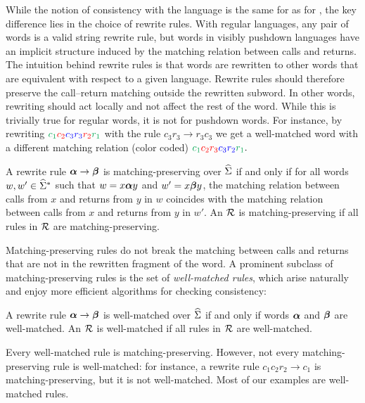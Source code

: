 While the notion of consistency with the language is the same for \DVPA as for \DFA, the key difference lies in the choice of rewrite rules. 
With regular languages, any pair of words is a valid string rewrite rule, but words in visibly pushdown languages 
have an implicit structure induced by the matching relation between calls and returns.
The intuition behind rewrite rules is that words are rewritten to other words that are equivalent with respect to a given language. 
Rewrite rules should therefore preserve the call--return matching outside the rewritten subword. 
In other words, rewriting should act locally and not affect the rest of the word.
While this is trivially true for regular words, it is not for pushdown words. 
For instance, by rewriting 
\(
\textcolor{Green}{c_1} \textcolor{red}{c_2} \textcolor{blue}{c_3} \textcolor{blue}{r_3} \textcolor{red}{r_2} \textcolor{Green}{r_1}
\) with the rule $c_3 r_3 \to r_3 c_3$
we get a well-matched word with a different matching relation (color coded) 
\(
\textcolor{Green}{c_1} \textcolor{red}{c_2} \textcolor{red}{r_3} \textcolor{blue}{c_3} \textcolor{blue}{r_2}  \textcolor{Green}{r_1}.
\)


\begin{definition}
A rewrite rule $\boldsymbol{\alpha} \to \boldsymbol{\beta}$ is {matching-preserving} over $\widehat{\Sigma}$ if and only if for all words $w,w' \in \widehat{\Sigma}^*$
such that $w = x \boldsymbol{\alpha} y$ and $w' = x \boldsymbol{\beta} y$, the matching relation between calls from $x$ and returns from $y$ in $w$
coincides with the matching relation between calls from $x$ and returns from $y$ in $w'$.
An \SRS $\mathcal{R}$ is {matching-preserving} if all rules in $\mathcal{R}$ are matching-preserving. 
\end{definition}

Matching-preserving rules do not break the matching between calls and returns that are not in the rewritten fragment of the word.
A prominent subclass of matching-preserving rules is the set of \emph{well-matched rules}, 
which arise naturally and enjoy more efficient algorithms for checking consistency:

\begin{definition}
A rewrite rule $\boldsymbol{\alpha} \to \boldsymbol{\beta}$ is well-matched over $\widehat{\Sigma}$ if and only if words $\boldsymbol{\alpha}$ and $\boldsymbol{\beta}$ are well-matched.
An \SRS $\mathcal{R}$ is {well-matched} if all rules in $\mathcal{R}$ are well-matched.
\end{definition}

Every well-matched rule is matching-preserving. However, not every matching-preserving rule is well-matched: 
for instance, a rewrite rule $c_1 c_2 r_2 \to c_1$
is matching-preserving, but it is not well-matched. Most of our examples are well-matched rules.

